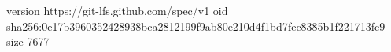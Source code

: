 version https://git-lfs.github.com/spec/v1
oid sha256:0e17b3960352428938bca2812199f9ab80e210d4f1bd7fec8385b1f221713fc9
size 7677
